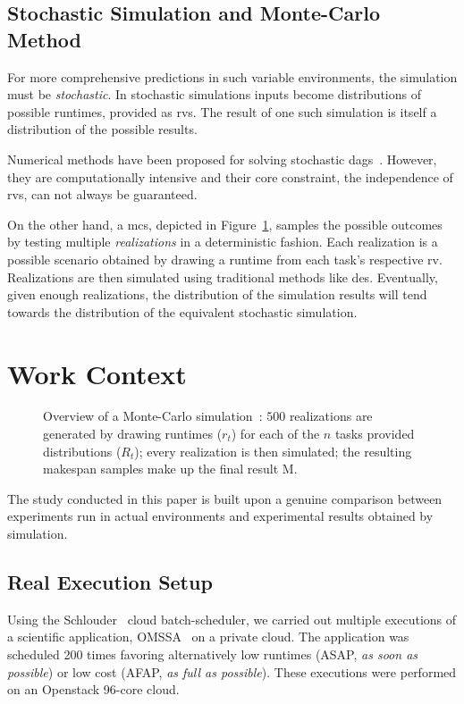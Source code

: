 \documentclass[10pt,conference,compsocconf]{IEEEtran}
\begin{document}
\subsection{Stochastic Simulation and Monte-Carlo Method}

\label{sc:relwork-stochastic}
For  more   comprehensive  predictions  in  such   variable  environments,  the
simulation must  be \emph{stochastic}.  In stochastic simulations  inputs become
distributions of possible runtimes, provided as \acp{rv}.
The  result  of one  such  simulation  is  itself  a distribution of the
possible results.

Numerical methods have been proposed for solving stochastic
\acp{dag}~\cite{Li97,Ludwig01}. However, they are computationally intensive and
their core constraint, the independence of \acp{rv}, can not always be
guaranteed. 

On the other hand, a \ac{mcs}, depicted in Figure~\ref{fig:mc-process}, samples
the possible outcomes by testing  multiple \emph{realizations} in a
deterministic fashion.  Each realization is a possible scenario obtained by
drawing a runtime from each task's respective \ac{rv}.  Realizations are then
simulated using traditional methods like \ac{des}.  Eventually, given enough
realizations, the distribution of the simulation results will  tend towards the
distribution of the equivalent stochastic simulation. 

\section{Work Context}
\label{sec:work-context}
\begin{figure}
	\centering
	\resizebox{0.9\linewidth}{!}{%
		
		}
\caption{Overview of a Monte-Carlo simulation~: $500$ realizations are generated
	by drawing runtimes ($r_t$) for each of the $n$ tasks provided
	distributions ($R_t$); every realization is then simulated; the 
	resulting makespan samples make up the final result M.}\label{fig:mc-process}
\end{figure}

The  study conducted  in this  paper  is built upon a genuine comparison  between
experiments  run in  actual environments  and experimental  results obtained  by
simulation.  

\subsection{Real Execution Setup}
Using the Schlouder~\cite{Michon17} cloud batch-scheduler, we carried out
multiple executions of a scientific application, OMSSA~\cite{Geer2004} on a
private cloud.  The application was scheduled 200 times favoring alternatively
low runtimes (ASAP, \emph{as soon as possible}) or low cost (AFAP, \emph{as full
as possible}). These executions were performed on an Openstack 96-core cloud. 
\end{document}
